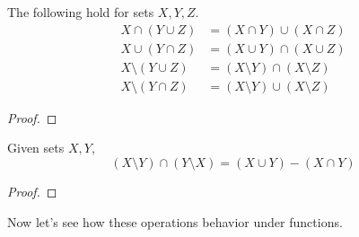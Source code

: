\documentclass{article}
\begin{document}
    \begin{theorem}
      The following hold for sets $X, Y, Z$. 
      \begin{align}
        X \cap (Y \cup Z) & = (X \cap Y) \cup (X \cap Z) \\  
        X \cup (Y \cap Z) & = (X \cup Y) \cap (X \cup Z) \\ 
        X \setminus (Y \cup Z) & = (X \setminus Y) \cap (X \setminus Z) \\
        X \setminus (Y \cap Z) & = (X \setminus Y) \cup (X \setminus Z)
      \end{align}
    \end{theorem}
    \begin{proof}
      
    \end{proof} 

    \begin{theorem}
      Given sets $X, Y$, 
      \begin{equation}
        (X \setminus Y) \cap (Y \setminus X) = (X \cup Y) - (X \cap Y)
      \end{equation}
    \end{theorem}
    \begin{proof}
      
    \end{proof} 

    Now let's see how these operations behavior under functions. 
\end{document}
